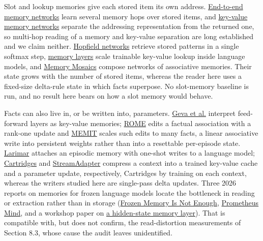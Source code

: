 Slot and lookup memories give each stored item its own address.
\href{https://arxiv.org/abs/1503.08895}{End-to-end memory networks} learn several memory hops over
stored items, and \href{https://aclanthology.org/D16-1147/}{key-value memory networks} separate the
addressing representation from the returned one, so multi-hop reading of a memory and
key-value separation are long established and we claim neither.
\href{https://arxiv.org/abs/2008.02217}{Hopfield networks} retrieve stored patterns in a single
softmax step, \href{https://arxiv.org/abs/2412.09764}{memory layers} scale trainable key-value
lookup inside language models, and \href{https://arxiv.org/abs/2405.06394}{Memory Mosaics} compose
networks of associative memories. Their state grows with the number of stored items, whereas
the reader here uses a fixed-size delta-rule state in which facts superpose. No slot-memory
baseline is run, and no result here bears on how a slot memory would behave.

Facts can also live in, or be written into, parameters.
\href{https://arxiv.org/abs/2012.14913}{Geva et al.} interpret feed-forward layers as key-value
memories; \href{https://arxiv.org/abs/2202.05262}{ROME} edits a factual association with a
rank-one update and \href{https://arxiv.org/abs/2210.07229}{MEMIT} scales such edits to many facts,
a linear associative write into persistent weights rather than into a resettable per-episode
state. \href{https://arxiv.org/abs/2403.11901}{Larimar} attaches an episodic memory with one-shot
writes to a language model; \href{https://arxiv.org/abs/2506.06266}{Cartridges} and
\href{https://arxiv.org/abs/2411.09289}{StreamAdapter} compress a context into a trained
key-value cache and a parameter update, respectively, Cartridges by training on each context,
whereas the writers studied here are single-pass delta updates. Three 2026 reports on
memories for frozen language models locate the bottleneck in reading or extraction rather
than in storage (\href{https://arxiv.org/abs/2608.17050}{Frozen Memory Is Not Enough},
\href{https://arxiv.org/abs/2601.15324}{Prometheus Mind}, and a workshop paper on
\href{https://neurips.cc/virtual/2026/170472}{a hidden-state memory layer}). That is compatible
with, but does not confirm, the read-distortion measurements of Section 8.3, whose cause the
audit leaves unidentified.  %

